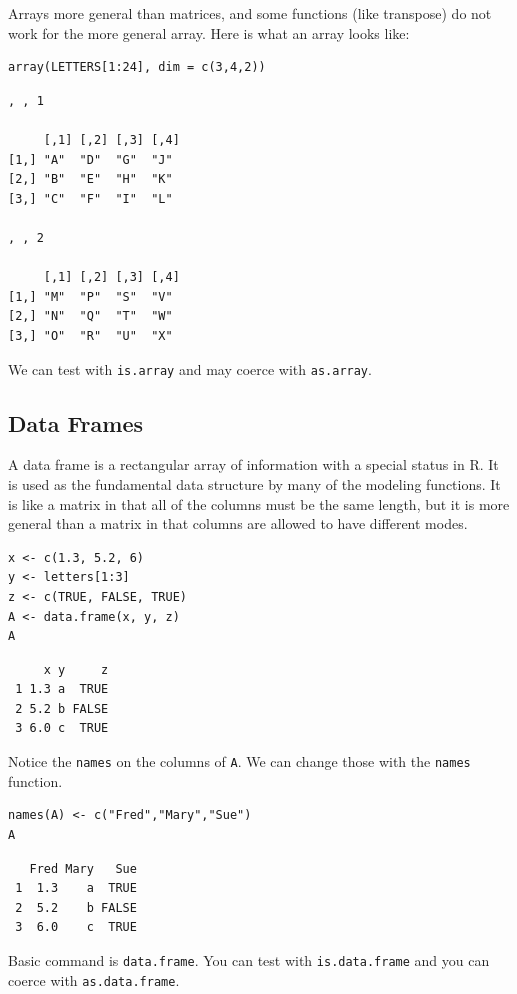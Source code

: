 \documentclass[captions=tableheading]{scrbook}
\begin{document}
Arrays more general than matrices, and some functions (like transpose) do not work for the more general array. Here is what an array looks like: 


\begin{verbatim}
array(LETTERS[1:24], dim = c(3,4,2))
\end{verbatim}


\begin{verbatim}
, , 1

     [,1] [,2] [,3] [,4]
[1,] "A"  "D"  "G"  "J" 
[2,] "B"  "E"  "H"  "K" 
[3,] "C"  "F"  "I"  "L" 

, , 2

     [,1] [,2] [,3] [,4]
[1,] "M"  "P"  "S"  "V" 
[2,] "N"  "Q"  "T"  "W" 
[3,] "O"  "R"  "U"  "X"
\end{verbatim}

We can test with \texttt{is.array} and may coerce with \texttt{as.array}.
\subsection{Data Frames}
\label{sec-20-1-3}


A data frame is a rectangular array of information with a special status in \textsf{R}. It is used as the fundamental data structure by many of the modeling functions. It is like a matrix in that all of the columns must be the same length, but it is more general than a matrix in that columns are allowed to have different modes.


\begin{verbatim}
x <- c(1.3, 5.2, 6)
y <- letters[1:3]
z <- c(TRUE, FALSE, TRUE)
A <- data.frame(x, y, z)
A
\end{verbatim}

\begin{verbatim}
     x y     z
 1 1.3 a  TRUE
 2 5.2 b FALSE
 3 6.0 c  TRUE
\end{verbatim}

Notice the \texttt{names} on the columns of \texttt{A}. We can change those with the \texttt{names} function.


\begin{verbatim}
names(A) <- c("Fred","Mary","Sue")
A
\end{verbatim}

\begin{verbatim}
   Fred Mary   Sue
 1  1.3    a  TRUE
 2  5.2    b FALSE
 3  6.0    c  TRUE
\end{verbatim}

Basic command is \texttt{data.frame}. You can test with \texttt{is.data.frame} and you can coerce with \texttt{as.data.frame}.
\end{document}
